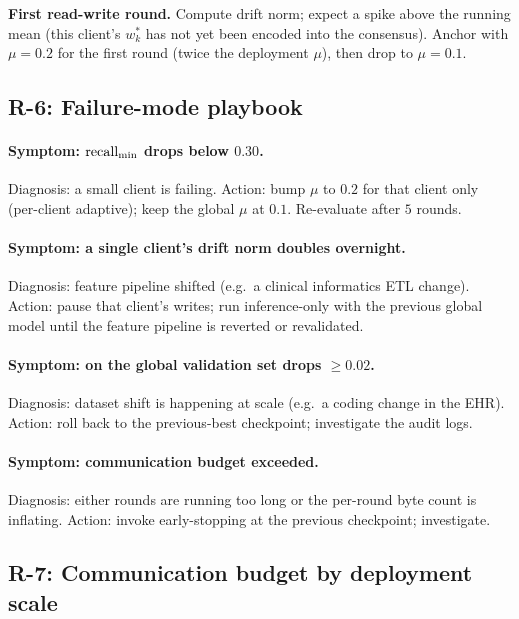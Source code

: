 \textbf{First read-write round.} Compute drift norm; expect a spike
above the running mean (this client's $w_k^*$ has not yet been
encoded into the consensus). Anchor with $\mu\!=\!0.2$ for the
first round (twice the deployment $\mu$), then drop to $\mu\!=\!0.1$.

\subsection{R-6: Failure-mode playbook}

\paragraph{Symptom: $\text{recall}_{\min}{}$ drops below $0.30$.}
Diagnosis: a small client is failing. Action: bump $\mu$ to $0.2$
for that client only (per-client adaptive); keep the global $\mu$
at $0.1$. Re-evaluate after $5$ rounds.

\paragraph{Symptom: a single client's drift norm doubles
overnight.} Diagnosis: feature pipeline shifted (e.g.\ a clinical
informatics ETL change). Action: pause that client's writes; run
inference-only with the previous global model until the feature
pipeline is reverted or revalidated.

\paragraph{Symptom: \auprc{} on the global validation set drops
$\geq 0.02$.} Diagnosis: dataset shift is happening at scale (e.g.\
a coding change in the EHR). Action: roll back to the
previous-best checkpoint; investigate the audit logs.

\paragraph{Symptom: communication budget exceeded.} Diagnosis:
either rounds are running too long or the per-round byte count is
inflating. Action: invoke early-stopping at the previous
checkpoint; investigate.

\subsection{R-7: Communication budget by deployment scale}

